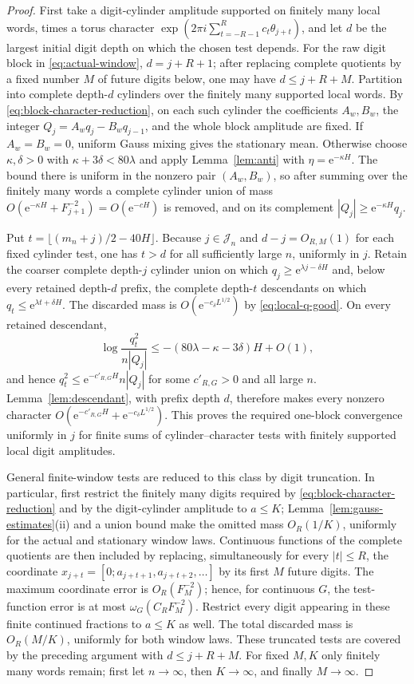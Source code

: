 \documentclass[11pt,a4paper]{amsart}
\theoremstyle{definition}
\theoremstyle{remark}
\newcommand{\e}{\mathrm e}
\begin{document}
\begin{proof}
First take a digit-cylinder amplitude supported on finitely many local words,
times a torus character
$\exp(2\pi i\sum_{t=-R-1}^{R}c_t\theta_{j+t})$, and let $d$ be the largest
initial digit depth on which the chosen test depends.  For the raw digit block
in \eqref{eq:actual-window}, $d=j+R+1$; after replacing complete quotients by
a fixed number $M$ of future digits below, one may have $d\le j+R+M$.
Partition into complete depth-$d$ cylinders over the finitely many supported
local words.  By \eqref{eq:block-character-reduction}, on each such cylinder
the coefficients $A_w,B_w$, the integer
$Q_j=A_wq_j-B_wq_{j-1}$, and the whole block amplitude are fixed.  If $A_w=B_w=0$, uniform Gauss mixing gives the stationary mean.
Otherwise choose $\kappa,\delta>0$ with
$\kappa+3\delta<80\lambda$ and apply Lemma~\ref{lem:anti} with
$\eta=\e^{-\kappa H}$.  The bound there is uniform in the nonzero pair
$(A_w,B_w)$, so after summing over the finitely many words a complete cylinder
union of mass
$O(\e^{-\kappa H}+F_{j+1}^{-2})=O(\e^{-cH})$ is removed, and on its complement
$|Q_j|\ge\e^{-\kappa H}q_j$.

Put $t=\lfloor(m_n+j)/2-40H\rfloor$.  Because
$j\in\mathcal J_n$ and $d-j=O_{R,M}(1)$ for each fixed cylinder test, one has
$t>d$ for all sufficiently large $n$, uniformly in $j$.  Retain the coarser
complete depth-$j$ cylinder union on which
$q_j\ge\e^{\lambda j-\delta H}$ and, below every retained depth-$d$ prefix,
the complete depth-$t$ descendants on which
$q_t\le\e^{\lambda t+\delta H}$.  The discarded mass is
$O(\e^{-c_\delta L^{1/2}})$ by \eqref{eq:local-q-good}.  On every retained
descendant,
\[
 \log\frac{q_t^2}{n|Q_j|}
 \le-(80\lambda-\kappa-3\delta)H+O(1),
\]
and hence $q_t^2\le\e^{-c'_{R,G}H}n|Q_j|$ for some $c'_{R,G}>0$ and all
large $n$.  Lemma~\ref{lem:descendant}, with prefix depth $d$, therefore
makes every nonzero character
$O(\e^{-c'_{R,G}H}+\e^{-c_\delta L^{1/2}})$.  This proves the required one-block convergence uniformly in $j$ for finite
sums of cylinder--character tests with finitely supported local digit
amplitudes.

General finite-window tests are reduced to this class by digit truncation.
In particular, first restrict the finitely many digits required by
\eqref{eq:block-character-reduction} and by the digit-cylinder amplitude to
$a\le K$; Lemma~\ref{lem:gauss-estimates}(ii) and a union bound make the
omitted mass $O_R(1/K)$, uniformly for the actual and stationary window laws.
Continuous functions of the complete quotients are then included by
replacing, simultaneously for every $|t|\le R$, the coordinate
$x_{j+t}=[0;a_{j+t+1},a_{j+t+2},\ldots]$ by its first $M$ future digits.  The
maximum coordinate error is $O_R(F_M^{-2})$; hence, for continuous $G$, the
test-function error is at most $\omega_G(C_RF_M^{-2})$.  Restrict every digit
appearing in these finite continued fractions to $a\le K$ as well.  The total
discarded mass is $O_R(M/K)$, uniformly for both window laws.  These truncated
tests are covered by the preceding argument with $d\le j+R+M$.  For fixed
$M,K$ only finitely many words remain; first let $n\to\infty$, then
$K\to\infty$, and finally $M\to\infty$.


\end{proof}
\end{document}
